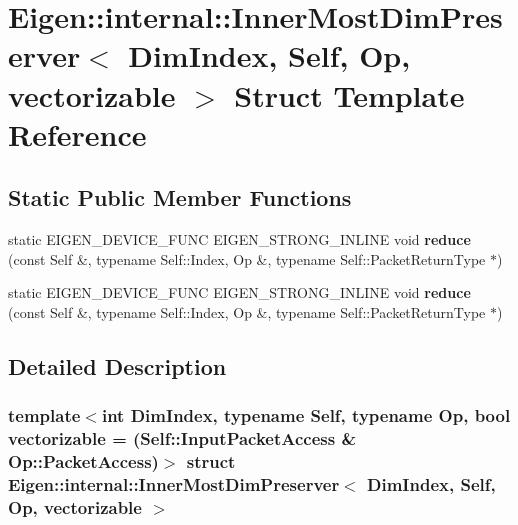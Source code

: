 \hypertarget{struct_eigen_1_1internal_1_1_inner_most_dim_preserver}{}\section{Eigen\+:\+:internal\+:\+:Inner\+Most\+Dim\+Preserver$<$ Dim\+Index, Self, Op, vectorizable $>$ Struct Template Reference}
\label{struct_eigen_1_1internal_1_1_inner_most_dim_preserver}
\subsection*{Static Public Member Functions}
\begin{DoxyCompactItemize}
\item 
\mbox{\label{struct_eigen_1_1internal_1_1_inner_most_dim_preserver_a7d25b417bffae714178267664312db58}} 
static E\+I\+G\+E\+N\+\_\+\+D\+E\+V\+I\+C\+E\+\_\+\+F\+U\+NC E\+I\+G\+E\+N\+\_\+\+S\+T\+R\+O\+N\+G\+\_\+\+I\+N\+L\+I\+NE void {\bfseries reduce} (const Self \&, typename Self\+::\+Index, Op \&, typename Self\+::\+Packet\+Return\+Type $\ast$)
\item 
\mbox{\label{struct_eigen_1_1internal_1_1_inner_most_dim_preserver_a7d25b417bffae714178267664312db58}} 
static E\+I\+G\+E\+N\+\_\+\+D\+E\+V\+I\+C\+E\+\_\+\+F\+U\+NC E\+I\+G\+E\+N\+\_\+\+S\+T\+R\+O\+N\+G\+\_\+\+I\+N\+L\+I\+NE void {\bfseries reduce} (const Self \&, typename Self\+::\+Index, Op \&, typename Self\+::\+Packet\+Return\+Type $\ast$)
\end{DoxyCompactItemize}


\subsection{Detailed Description}
\subsubsection*{template$<$int Dim\+Index, typename Self, typename Op, bool vectorizable = (\+Self\+::\+Input\+Packet\+Access \& Op\+::\+Packet\+Access)$>$\newline
struct Eigen\+::internal\+::\+Inner\+Most\+Dim\+Preserver$<$ Dim\+Index, Self, Op, vectorizable $>$}



